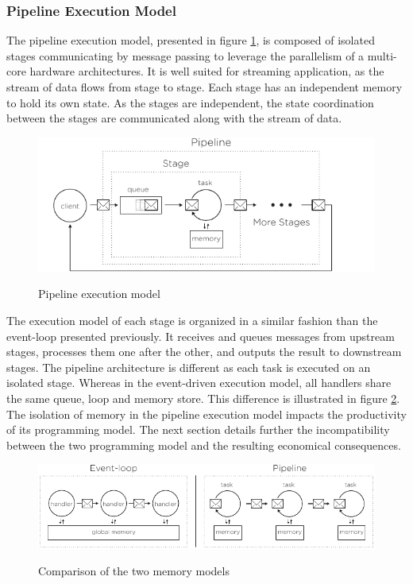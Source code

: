 \subsubsection{Pipeline Execution Model}

The pipeline execution model, presented in figure \ref{fig:pipeline}, is composed of isolated stages communicating by message passing to leverage the parallelism of a multi-core hardware architectures.
It is well suited for streaming application, as the stream of data flows from stage to stage.
Each stage has an independent memory to hold its own state.
As the stages are independent, the state coordination between the stages are communicated along with the stream of data.

\begin{figure}[h!]
  \centering
  \includegraphics[width=0.8\linewidth]{../resources/pipeline.pdf}
  \label{fig:pipeline}
  \caption{Pipeline execution model}
\end{figure}

The execution model of each stage is organized in a similar fashion than the event-loop presented previously.
It receives and queues messages from upstream stages, processes them one after the other, and outputs the result to downstream stages.
The pipeline architecture is different as each task is executed on an isolated stage.
Whereas in the event-driven execution model, all handlers share the same queue, loop and memory store.
This difference is illustrated in figure \ref{fig:models-difference}.
The isolation of memory in the pipeline execution model impacts the productivity of its programming model.
The next section details further the incompatibility between the two programming model and the resulting economical consequences.

\begin{figure}[h!]
  \centering
  \includegraphics[width=0.8\linewidth]{../resources/models-difference.pdf}
  \label{fig:models-difference}
  \caption{Comparison of the two memory models}
\end{figure}


